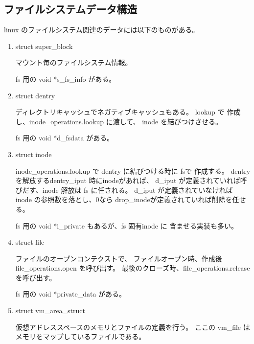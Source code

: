 \subsection{ファイルシステムデータ構造}
	linux のファイルシステム関連のデータには以下のものがある。
	\begin{enumerate}
	\item	struct super_block \par
		マウント毎のファイルシステム情報。

		fs 用の void *s_fs_info がある。	
	\item	struct dentry \par
		ディレクトリキャッシュでネガティブキャッシュもある。
		lookup で 作成し、inode_operations.lookup に渡して、
		inode を結びつけさせる。
		
		fs 用の void *d_fsdata がある。	
	\item	struct inode \par
		inode_operations.lookup で dentry に結びつける時に fsで
		作成する。
		dentry を解放するdentry_iput 時にinodeがあれば、
		d_iput が定義されていれば呼びだす、inode 解放は fs に任される。
		d_iput が定義されていなければ inode の参照数を落とし、0なら
		drop_inodeが定義されていれば削除を任せる。
		

		fs 用の void *i_private もあるが、fs 固有inode に
                含ませる実装も多い。
	\item	struct file \par
		ファイルのオープンコンテクストで、
		ファイルオープン時、作成後 file_operations.open を呼び出す。
		最後のクローズ時、file_operations.release を呼び出す。

		fs 用の void *private_data がある。	

	\item	struct vm_area_struct \par
		仮想アドレススペースのメモリとファイルの定義を行う。
		ここの vm_file はメモリをマップしているファイルである。
	\end{enumerate}
\clearpage

